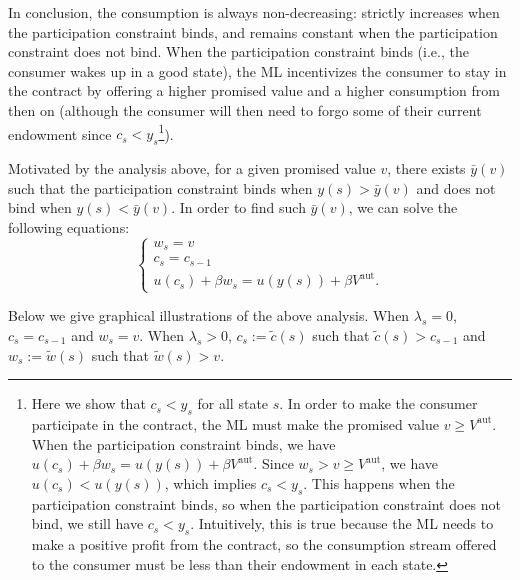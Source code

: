 In conclusion, the consumption is always non-decreasing: strictly increases when the participation constraint binds, and remains constant when the participation constraint does not bind. When the participation constraint binds (i.e., the consumer wakes up in a good state), the ML incentivizes the consumer to stay in the contract by offering a higher promised value and a higher consumption from then on (although the consumer will then need to forgo some of their current endowment since $c_s<y_s$\footnote{
Here we show that $c_s<y_s$ for all state $s$. In order to make the consumer participate in the contract, the ML must make the promised value $v\ge V^{\text{aut}}$. When the participation constraint binds, we have $u(c_s)+\beta w_s = u(y(s)) + \beta V^{\text{aut}}$. Since $w_s>v\ge V^{\text{aut}}$, we have $u(c_s)<u(y(s))$, which implies $c_s<y_s$. This happens when the participation constraint binds, so when the participation constraint does not bind, we still have $c_s < y_s$. Intuitively, this is true because the ML needs to make a positive profit from the contract, so the consumption stream offered to the consumer must be less than their endowment in each state.
}).

Motivated by the analysis above, for a given promised value $v$, there exists $\bar y(v)$ such that the participation constraint binds when $y(s)>\bar y(v)$ and does not bind when $y(s)<\bar y(v)$. In order to find such $\bar y(v)$, we can solve the following equations:
    \[
    \begin{cases}
        w_s = v\\
        c_s = c_{s-1}\\
        u(c_s)+\beta w_s = u(y(s)) + \beta V^{\text{aut}}.
    \end{cases}
\]

Below we give graphical illustrations of the above analysis. When $\lambda_s = 0$, $c_s = c_{s-1}$ and $w_s = v$. When $\lambda_s>0$, $c_s :=\tilde c(s)$ such that $\tilde c(s)>c_{s-1}$ and $w_s := \tilde w(s)$ such that $\tilde w(s)>v$.

\begin{center}
\end{center}

